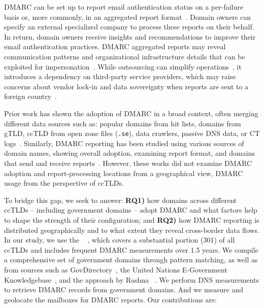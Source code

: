 \gls{DMARC} can be set up to report email authentication status on a per-failure basis or, more commonly, in an aggregated report format~\cite{hureau_stress_testing}.
Domain owners can specify an external specialized company to process these reports on their behalf. In return, domain owners receive insights and recommendations to improve their email authentication practices.
\gls{DMARC} aggregated reports may reveal communication patterns and organizational infrastructure details that can be exploited for impersonation~\cite{hureau_spoofed,rfc7489}.
While outsourcing can simplify operations~\cite{_DMARCReportsGoogle_}, it introduces a dependency on third-party service providers, which may raise concerns about vendor lock-in and data sovereignty when reports are sent to a foreign country~\cite{hureau_spoofed, _EuropeanCriticalDependencies_2025}.

Prior work has shown the adoption of \gls{DMARC} in a broad context, often merging different data sources such as: popular domains from hit lists, domains from \gls{gTLD}, \gls{ccTLD} from open zone files (\eg \texttt{.se}), data crawlers, passive DNS data, or \gls{CT} logs~\cite{hureau_spoofed, ashiq2023,han_libo2023,han_dengke2023,tatang2021,MaroofiEtAl_AdoptionEmailAntiSpoofing_2021}.
Similarly, \gls{DMARC} reporting has been studied using various sources of domain names, showing overall adoption, examining report format, and domains that send and receive reports~\cite{ashiq2023,hureau_spoofed,hureau_stress_testing}.
However, these works did not examine \gls{DMARC} adoption and report-processing locations from a geographical view, \ie \gls{DMARC} usage from the perspective of \glspl{ccTLD}.

To bridge this gap, we seek to answer: \textbf{RQ1)} how domains across different \glspl{ccTLD} -- including government domains -- adopt \gls{DMARC} and what factors help to shape the strength of their configuration; and \textbf{RQ2)} how \gls{DMARC} reporting is distributed geographically and to what extent they reveal cross-border data flows.
In our study, we use the \openintel~\cite{openintel} \dataset, which covers a substantial portion (301) of all \glspl{ccTLD} and includes frequent \gls{DMARC} measurements over 1.5 years.
We compile a comprehensive set of government domains through pattern matching, as well as from sources such as GovDirectory~\cite{govdirectory}, the United Nations E-Government Knowledgebase~\cite{_EGOVKBUnitedNations_}, and the approach by Rashna \etal~\cite{rashna2024}.
We perform \gls{DNS} measurements to retrieve \gls{DMARC} records from government domains.
And we measure and geolocate the mailboxes for \gls{DMARC} reports.
Our contributions are:

